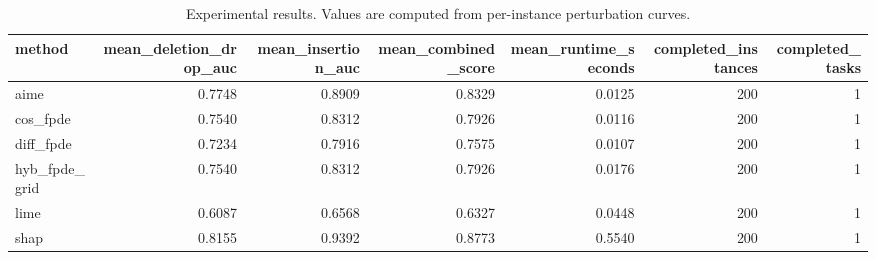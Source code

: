 \begin{table}[t]
\caption{Experimental results. Values are computed from per-instance perturbation curves.}
\label{tab:main_results_computed}
\centering
\begin{tabular}{lrrrrrr}
\toprule
method & mean\_deletion\_drop\_auc & mean\_insertion\_auc & mean\_combined\_score & mean\_runtime\_seconds & completed\_instances & completed\_tasks \\
\midrule
aime & 0.7748 & 0.8909 & 0.8329 & 0.0125 & 200 & 1 \\
cos\_fpde & 0.7540 & 0.8312 & 0.7926 & 0.0116 & 200 & 1 \\
diff\_fpde & 0.7234 & 0.7916 & 0.7575 & 0.0107 & 200 & 1 \\
hyb\_fpde\_grid & 0.7540 & 0.8312 & 0.7926 & 0.0176 & 200 & 1 \\
lime & 0.6087 & 0.6568 & 0.6327 & 0.0448 & 200 & 1 \\
shap & 0.8155 & 0.9392 & 0.8773 & 0.5540 & 200 & 1 \\
\bottomrule
\end{tabular}

\end{table}
